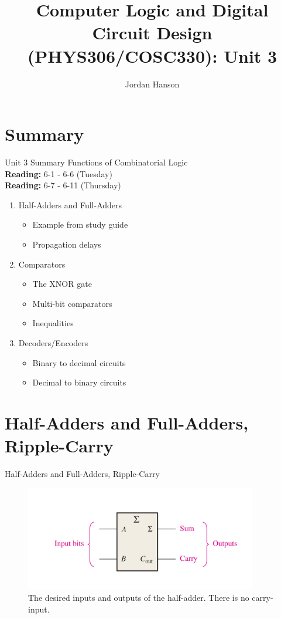 \documentclass{beamer}
\title{Computer Logic and Digital Circuit Design (PHYS306/COSC330): Unit 3}
\author{Jordan Hanson}
\institute{Whittier College Department of Physics and Astronomy}
\begin{document}
\maketitle

\section{Summary}

\begin{frame}{Unit 3 Summary}
\alert{Functions of Combinatorial Logic} \\
\textbf{Reading:} 6-1 - 6-6 (Tuesday) \\
\textbf{Reading:} 6-7 - 6-11 (Thursday)
\begin{enumerate}
\item Half-Adders and Full-Adders
\begin{itemize}
\item Example from study guide
\item Propagation delays
\end{itemize}
\item Comparators
\begin{itemize}
\item The XNOR gate
\item Multi-bit comparators
\item Inequalities
\end{itemize}
\item Decoders/Encoders
\begin{itemize}
\item Binary to decimal circuits
\item Decimal to binary circuits
\end{itemize}
\end{enumerate}
\end{frame}

\section{Half-Adders and Full-Adders, Ripple-Carry}

\begin{frame}{Half-Adders and Full-Adders, Ripple-Carry}
\begin{figure}
\centering
\includegraphics[width=0.9\textwidth]{figures/adder1.pdf}
\caption{\label{fig:add1} The desired inputs and outputs of the half-adder.  There is no carry-input.}
\end{figure}
\end{frame}
\end{document}
